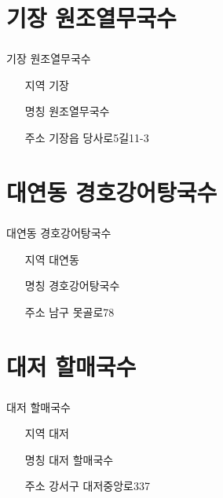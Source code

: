 \documentclass[aspectratio=1610,17pt,xcolor=pdftex,dvipsnames,table,handout]{beamer}
\begin{document}
		\section{ 기장 원조열무국수	}
		\begin{frame} [t,plain]
		\frametitle{ }
			\begin{block} {기장 원조열무국수	}
			\setlength{\leftmargini}{4em}			
			\begin{itemize}
				\item [지역] 기장	
				\item [명칭] 원조열무국수	
				\item [주소] 기장읍 당사로5길11-3
			\end{itemize}
			\end{block}						
		\end{frame}						


		\section{ 대연동 경호강어탕국수	}
		\begin{frame} [t,plain]
		\frametitle{ }
			\begin{block} {대연동 경호강어탕국수	}
			\setlength{\leftmargini}{4em}			
			\begin{itemize}
				\item [지역] 대연동	
				\item [명칭] 경호강어탕국수	
				\item [주소] 남구 못골로78
			\end{itemize}
			\end{block}						
		\end{frame}						


		\section{ 대저 할매국수	}
		\begin{frame} [t,plain]
		\frametitle{ }
			\begin{block} {대저 할매국수	}
			\setlength{\leftmargini}{4em}			
			\begin{itemize}
				\item [지역] 대저	
				\item [명칭] 대저 할매국수	
				\item [주소] 강서구 대저중앙로337
			\end{itemize}
			\end{block}						
		\end{frame}						
\end{document}
